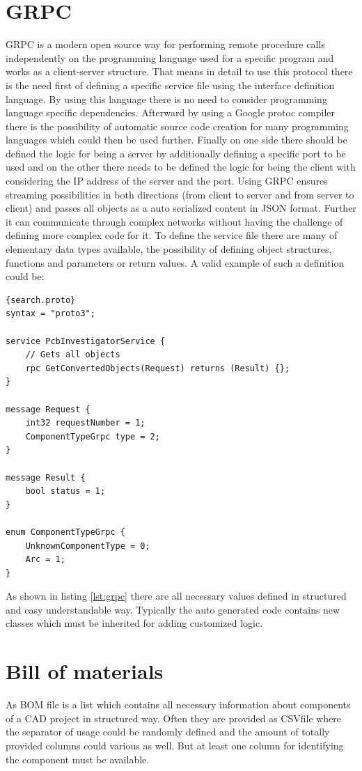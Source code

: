 	\section{GRPC}
\ac{GRPC} is a modern open source way for performing remote procedure calls independently on the programming language used for a specific program and works as a client-server structure.\cite{gRPC.482021} That means in detail to use this protocol there is the need first of defining a specific service file using the interface definition language. By using this language there is no need to consider programming language specific dependencies. Afterward by using a Google protoc compiler there is the possibility of automatic source code creation for many programming languages which could then be used further. Finally on one side there should be defined the logic for being a server by additionally defining a specific port to be used and on the other there needs to be defined the logic for being the client with considering the IP address of the server and the port. Using \ac{GRPC} ensures streaming possibilities in both directions (from client to server and from server to client) and passes all objects as a auto serialized content in \ac{JSON} format. Further it can communicate through complex networks without having the challenge of defining more complex code for it. To define the service file there are many of elementary data types available, the possibility of defining object structures, functions and parameters or return values. A valid example of such a definition could be:

\begin{lstlisting}[language=protobuf2,style=protobuf,caption={Interface definition of GRPC exchange},captionpos=b,label=lst:grpc]{search.proto}
syntax = "proto3";

service PcbInvestigatorService {
	// Gets all objects
	rpc GetConvertedObjects(Request) returns (Result) {};
}

message Request {
	int32 requestNumber = 1;
	ComponentTypeGrpc type = 2;
}

message Result {
	bool status = 1;
}

enum ComponentTypeGrpc {
	UnknownComponentType = 0;
	Arc = 1;
}
\end{lstlisting}

As shown in listing \ref{lst:grpc} there are all necessary values defined in structured and easy understandable way. Typically the auto generated code contains new classes which must be inherited for adding customized logic.

	\section{Bill of materials}
As \ac{BOM} file is a list which contains all necessary information about components of a \ac{CAD} project in structured way.\cite{Wikipedia.2021c} Often they are provided as \ac{CSV}file where the separator of usage could be randomly defined and the amount of totally provided columns could various as well. But at least one column for identifying the component must be available.